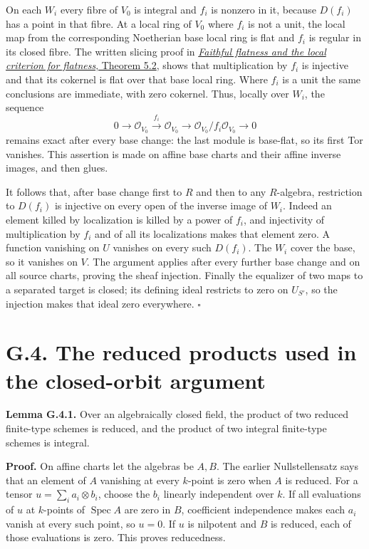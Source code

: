 \documentclass[11pt,a4paper,openany]{report}
\begin{document}
On each \(W_i\) every fibre of \(V_0\) is integral and \(f_i\) is nonzero in it, because \(D(f_i)\) has a point in that fibre. At a local ring of \(V_0\) where \(f_i\) is not a unit, the local map from the corresponding Noetherian base local ring is flat and \(f_i\) is regular in its closed fibre. The written slicing proof in \href{https://github.com/KokunoYumeto/open-math-courses/blob/d02d0a3669f42579db037cd44de1d113fdd770a1/docs/courses/AG-CA/src/faithful-flatness-and-the-local-criterion-for-flatness.md\#5-lifting-a-regular-equation-from-the-fibre}{\emph{Faithful flatness and the local criterion for flatness}, Theorem 5.2}, shows that multiplication by \(f_i\) is injective and that its cokernel is flat over that base local ring. Where \(f_i\) is a unit the same conclusions are immediate, with zero cokernel. Thus, locally over \(W_i\), the sequence \[
0\longrightarrow\mathcal O_{V_0}\xrightarrow{f_i}\mathcal O_{V_0}\longrightarrow\mathcal O_{V_0}/f_i\mathcal O_{V_0}\longrightarrow0
\] remains exact after every base change: the last module is base-flat, so its first Tor vanishes. This assertion is made on affine base charts and their affine inverse images, and then glues.

It follows that, after base change first to \(R\) and then to any \(R\)-algebra, restriction to \(D(f_i)\) is injective on every open of the inverse image of \(W_i\). Indeed an element killed by localization is killed by a power of \(f_i\), and injectivity of multiplication by \(f_i\) and of all its localizations makes that element zero. A function vanishing on \(U\) vanishes on every such \(D(f_i)\). The \(W_i\) cover the base, so it vanishes on \(V\). The argument applies after every further base change and on all source charts, proving the sheaf injection. Finally the equalizer of two maps to a separated target is closed; its defining ideal restricts to zero on \(U_{S'}\), so the injection makes that ideal zero everywhere. \(\square\)

\section{G.4. The reduced products used in the closed-orbit argument}\label{AG-RG-S08-g.4.-the-reduced-products-used-in-the-closed-orbit-argument}

\textbf{Lemma G.4.1.} Over an algebraically closed field, the product of two reduced finite-type schemes is reduced, and the product of two integral finite-type schemes is integral.

\textbf{Proof.} On affine charts let the algebras be \(A,B\). The earlier Nullstellensatz says that an element of \(A\) vanishing at every \(k\)-point is zero when \(A\) is reduced. For a tensor \(u=\sum_i a_i\otimes b_i\), choose the \(b_i\) linearly independent over \(k\). If all evaluations of \(u\) at \(k\)-points of \(\operatorname{Spec}A\) are zero in \(B\), coefficient independence makes each \(a_i\) vanish at every such point, so \(u=0\). If \(u\) is nilpotent and \(B\) is reduced, each of those evaluations is zero. This proves reducedness.
\end{document}
